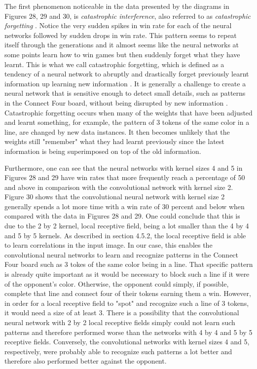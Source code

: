 \documentclass[titlepage]{article}
\begin{document}
\vskip 0.2cm

\noindent
The first phenomenon noticeable in the data presented by the diagrams in Figures 28, 29 and 30, is \emph{catastrophic interference}, also referred to as \emph{catastrophic forgetting} \cite{catastrophic}. Notice the very sudden spikes in win rate for each of the neural networks followed by sudden drops in win rate. This pattern seems to repeat itself through the generations and it almost seems like the neural networks at some points learn how to win games but then suddenly forget what they have learnt. This is what we call catastrophic forgetting, which is defined as a tendency of a neural network to abruptly and drastically forget previously learnt information up learning new information \cite{catastrophic}. It is generally a challenge to create a neural network that is sensitive enough to detect small details, such as patterns in the Connect Four board, without being disrupted by new information \cite{catastrophic}. Catastrophic forgetting occurs when many of the weights that have been adjusted and learnt something, for example, the pattern of 3 tokens of the same color in a line, are changed by new data instances. It then becomes unlikely that the weights still "remember" what they had learnt previously since the latest information is being superimposed on top of the old information.

\vskip 0.2cm

\noindent
Furthermore, one can see that the neural networks with kernel sizes 4 and 5 in Figures 28 and 29 have win rates that more frequently reach a percentage of 50 and above in comparison with the convolutional network with kernel size 2. Figure 30 shows that the convolutional neural network with kernel size 2 generally spends a lot more time with a win rate of 30 percent and below when compared with the data in Figures 28 and 29. One could conclude that this is due to the 2 by 2 kernel, local receptive field, being a lot smaller than the 4 by 4 and 5 by 5 kernels. As described in section 4.5.2, the local receptive field is able to learn correlations in the input image. In our case, this enables the convolutional neural networks to learn and recognize patterns in the Connect Four board such as 3 tokes of the same color being in a line. That specific pattern is already quite important as it would be necessary to block such a line if it were of the opponent's color. Otherwise, the opponent could simply, if possible, complete that line and connect four of their tokens earning them a win. However, in order for a local receptive field to "spot" and recognize such a line of 3 tokens, it would need a size of at least 3. There is a possibility that the convolutional neural network with 2 by 2 local receptive fields simply could not learn such patterns and therefore performed worse than the networks with 4 by 4 and 5 by 5 receptive fields. Conversely, the convolutional networks with kernel sizes 4 and 5, respectively, were probably able to recognize such patterns a lot better and therefore also performed better against the opponent.
\end{document}
